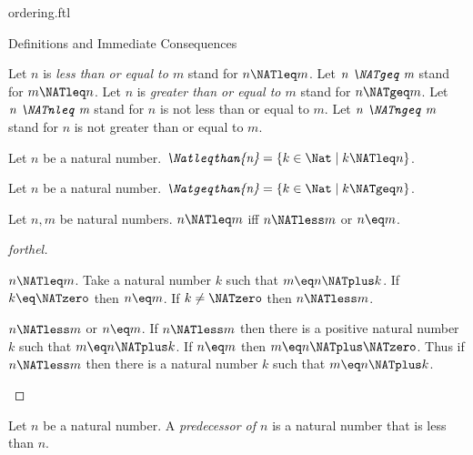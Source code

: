\documentclass{naproche-library}
\begin{document}
\begin{smodule}[title=The Standard Ordering of the Natural Numbers]{ordering.ftl}
\begin{sfragment}{Definitions and Immediate Consequences}
\begin{definition}[forthel,id=ARITHMETIC_04_4593841531256832]
    Let $n$ is \emph{less than or equal to $m$} stand for $n \NATleq m$.
    Let $\emph{n \NATgeq m}$ stand for $m \NATleq n$.
    Let $n$ is \emph{greater than or equal to $m$} stand for $n \NATgeq m$.
    Let $\emph{n \NATnleq m}$ stand for $n$ is not less than or equal to $m$.
    Let $\emph{n \NATngeq m}$ stand for $n$ is not greater than or equal to $m$.
  \end{definition}

  \begin{definition}[forthel,id=ARITHMETIC_04_72501526790144]
    Let $n$ be a natural number.
    $\emph{\Natleqthan{n}} = \{ k \in \Nat \mid k \NATleq n \}$.
  \end{definition}

  \begin{definition}[forthel,id=ARITHMETIC_04_1706933421604864]
    Let $n$ be a natural number.
    $\emph{\Natgeqthan{n}} = \{ k \in \Nat \mid k \NATgeq n \}$.
  \end{definition}

  \begin{proposition}[forthel,id=ARITHMETIC_04_5385415374667776]
    Let $n, m$ be natural numbers.
    $n \NATleq m$ iff $n \NATless m$ or $n \eq m$.
  \end{proposition}
  \begin{proof}[forthel]
    \begin{case}{$n \NATleq m$.}
      Take a natural number $k$ such that $m \eq n \NATplus k$.
      If $k \eq \NATzero$ then $n \eq m$. If $k \neq \NATzero$ then $n \NATless m$.
    \end{case}

    \begin{case}{$n \NATless m$ or $n \eq m$.}
      If $n \NATless m$ then there is a positive natural number $k$ such that $m \eq n \NATplus k$.
      If $n \eq m$ then $m \eq n \NATplus \NATzero$.
      Thus if $n \NATless m$ then there is a natural number $k$ such that $m \eq n \NATplus k$.
    \end{case}
  \end{proof}


  \begin{definition}[forthel,id=ARITHMETIC_04_6232154608500736]
    Let $n$ be a natural number.
    A \emph{predecessor of $n$} is a natural number that is less than $n$.
  \end{definition}



\end{sfragment}
\end{smodule}
\end{document}
